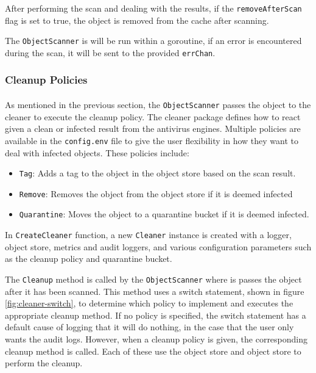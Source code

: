 \documentclass[12pt, conference, final, a4paper, onecolumn, compsoc]{IEEEtran}
\begin{document}
After performing the scan and dealing with the results, if the
\texttt{removeAfterScan} flag is set to true, the object is removed from the
cache after scanning.

The \texttt{ObjectScanner} is will be run within a goroutine, if an error is
encountered during the scan, it will be sent to the provided \texttt{errChan}.

\subsubsection*{Cleanup Policies}
\paragraph{}


As mentioned in the previous section, the \texttt{ObjectScanner} passes the
object to the cleaner to execute the cleanup policy. The cleaner package defines
how to react given a clean or infected result from the antivirus engines.
Multiple policies are available in the \texttt{config.env} file to give the user
flexibility in how they want to deal with infected objects. These policies
include:

\begin{itemize}
  \item \texttt{Tag}: Adds a tag to the object in the object store based on the
        scan result.
  \item \texttt{Remove}: Removes the object from the object store if it is
        deemed infected
  \item \texttt{Quarantine}: Moves the object to a quarantine bucket if it is
        deemed infected.
\end{itemize}

In \texttt{CreateCleaner} function, a new \texttt{Cleaner} instance is created
with a logger, object store, metrics and audit loggers, and various
configuration parameters such as the cleanup policy and quarantine bucket.

The \texttt{Cleanup} method is called by the \texttt{ObjectScanner} where is
passes the object after it has been scanned. This method uses a switch
statement, shown in figure \ref{fig:cleaner-switch}, to determine which policy
to implement and executes the appropriate cleanup method. If no policy is
specified, the switch statement has a default cause of logging that it will do
nothing, in the case that the user only wants the audit logs. However, when a
cleanup policy is given, the corresponding cleanup method is called. Each of these
use the object store and object store to perform the cleanup.
\end{document}

